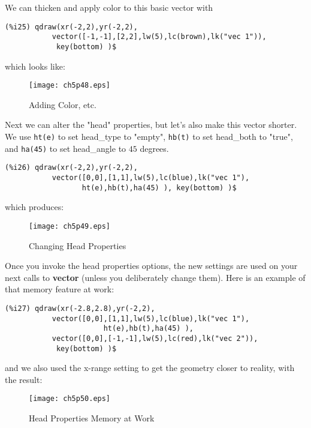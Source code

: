 \documentclass[12pt]{article}
\begin{document}
\smallskip
We can thicken and apply color to this basic vector with
\small
\begin{verbatim}
(%i25) qdraw(xr(-2,2),yr(-2,2),
           vector([-1,-1],[2,2],lw(5),lc(brown),lk("vec 1")),
            key(bottom) )$
\end{verbatim}
\normalsize
%
which looks like:
\begin{figure} [h]
   \centerline{\texttt{[image: ch5p48.eps]} }
	\caption{Adding Color, etc.}
\end{figure}      

\newpage
Next we can alter the "head" properties, but let's also make this vector
  shorter.
We use \verb|ht(e)| to set head\_type to "empty", \verb|hb(t)| to
  set head\_both to "true", and \verb|ha(45)| to set head\_angle
  to $45$ degrees.
\small
\begin{verbatim}
(%i26) qdraw(xr(-2,2),yr(-2,2),
           vector([0,0],[1,1],lw(5),lc(blue),lk("vec 1"),
                  ht(e),hb(t),ha(45) ), key(bottom) )$
\end{verbatim}
\normalsize
%
which produces:
\begin{figure} [h]
   \centerline{\texttt{[image: ch5p49.eps]} }
	\caption{Changing Head Properties}
\end{figure}      

\smallskip
Once you invoke the head properties options, the new settings are
  used on your next calls to \textbf{vector} (unless you deliberately
  change them).
Here is an example of that memory feature at work:
\small
\begin{verbatim}
(%i27) qdraw(xr(-2.8,2.8),yr(-2,2),
           vector([0,0],[1,1],lw(5),lc(blue),lk("vec 1"),
                       ht(e),hb(t),ha(45) ),
           vector([0,0],[-1,-1],lw(5),lc(red),lk("vec 2")),
            key(bottom) )$
\end{verbatim}
\normalsize
%
and we also used the x-range setting to get the geometry closer to reality,
with the result:
\begin{figure} [h]
   \centerline{\texttt{[image: ch5p50.eps]} }
	\caption{Head Properties Memory at Work}
\end{figure}      		   
\newpage
\end{document}
